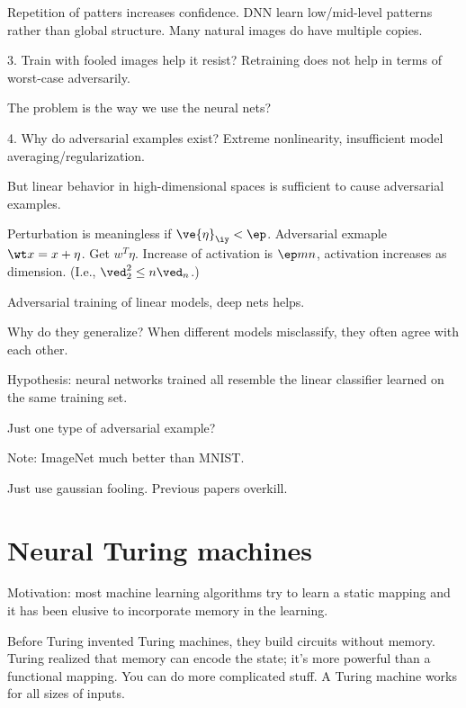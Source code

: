 Repetition of patters increases confidence. DNN learn low/mid-level patterns rather than global structure. Many natural images do have multiple copies.

3. Train with fooled images help it resist? Retraining does not help in terms of worst-case adversarily. 


The problem is the way we use the neural nets?

4. Why do adversarial examples exist? Extreme nonlinearity, insufficient model averaging/regularization.

But linear behavior in high-dimensional spaces is sufficient to cause adversarial examples.

Perturbation is meaningless if $\ve{\eta}_{\iy}<\ep$. Adversarial exmaple $\wt x=x+\eta$. Get $w^T\eta$. Increase of activation is $\ep m n$, activation increases as dimension.
(I.e., $\ved_{2}^2\le n \ved_n$.)


Adversarial training of linear models, deep nets helps.

Why do they generalize? When different models misclassify, they often agree with each other.

Hypothesis: neural networks trained all resemble the linear classifier learned on the same training set.

Just one type of adversarial example?
%

Note: ImageNet much better than MNIST.

Just use gaussian fooling. Previous papers overkill. 

\section{Neural Turing machines}

Motivation: most machine learning algorithms try to learn a static mapping and it has been elusive to incorporate memory in the learning.

Before Turing invented Turing machines, they build circuits without memory. Turing realized that memory can encode the state; it's more powerful than a functional mapping. You can do more complicated stuff. A Turing machine works for all sizes of inputs.

